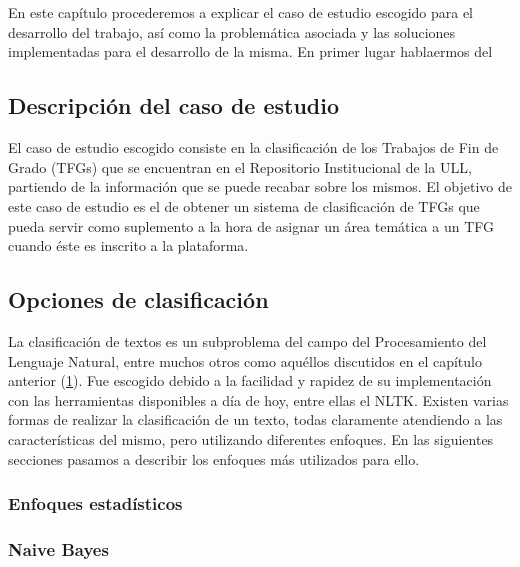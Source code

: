 \chapter{\ChapterTwo{}} \label{amigo}

En este capítulo procederemos a explicar el caso de estudio escogido para el desarrollo del trabajo, así como la problemática asociada y las soluciones implementadas para el desarrollo de la misma. En primer lugar hablaermos del 

\section{Descripción del caso de estudio}

El caso de estudio escogido consiste en la clasificación de los Trabajos de Fin de Grado (TFGs) que se encuentran en el Repositorio Institucional de la ULL, partiendo de la información que se puede recabar sobre los mismos.
%
El objetivo de este caso de estudio es el de obtener un sistema de clasificación de TFGs que pueda servir como suplemento a la hora de asignar un área temática a un TFG cuando éste es inscrito a la plataforma.

\section{Opciones de clasificación}

La clasificación de textos es un subproblema del campo del Procesamiento del Lenguaje Natural, entre muchos otros como aquéllos discutidos en el capítulo anterior (\ref{amigo}).
%
Fue escogido debido a la facilidad y rapidez de su implementación con las herramientas disponibles a día de hoy, entre ellas el NLTK.
%
Existen varias formas de realizar la clasificación de un texto, todas claramente atendiendo a las características del mismo, pero utilizando diferentes enfoques.
%
En las siguientes secciones pasamos a describir los enfoques más utilizados para ello.

\subsection{Enfoques estadísticos}



\subsection{Naive Bayes}

